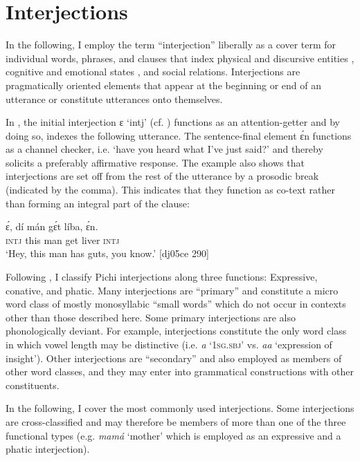 \section{Interjections}\label{sec:12.2}

In the following, I employ the term “interjection” liberally as a cover term for individual words, phrases, and clauses that index physical and discursive entities \citep{Kockelman2003}, cognitive and emotional states \citep{Ameka1992a}, and social relations. Interjections are pragmatically oriented elements that appear at the beginning or end of an utterance or constitute utterances onto themselves.


In , the initial interjection ɛ ‘intj’ (cf. ) functions as an attention-getter and by doing so, indexes the following utterance. The sentence-final element ɛ́n functions as a channel checker, i.e. ‘have you heard what I’ve just said?’ and thereby solicits a preferably affirmative response. The example also shows that interjections are set off from the rest of the utterance by a prosodic break (indicated by the comma). This indicates that they function as co-text rather than forming an integral part of the clause:



\ea%
    \label{ex:key:1635}
    \gll ɛ́,  dí  mán    gɛ́t  líba,    ɛ́n.\\
\textsc{intj}  this  man    get  liver  \textsc{intj}\\

\glt ‘Hey, this man has guts, you know.’ [dj05ce 290]
\z

Following \citet{Ameka1992a,Ameka1992b}, I classify Pichi interjections along three functions: Expressive, conative, and phatic. Many interjections are “primary” \citep{Ameka1992a} and constitute a micro word class of mostly monosyllabic “small words” which do not occur in contexts other than those described here. Some primary interjections are also phonologically deviant. For example, interjections constitute the only word class in which vowel length may be distinctive (i.e. \textit{a} ‘\textsc{1sg.sbj}’ vs. \textit{aa} ‘expression of insight’). Other interjections are “secondary” and also employed as members of other word classes, and they may enter into grammatical constructions with other constituents. 


In the following, I cover the most commonly used interjections. Some interjections are cross-classified and may therefore be members of more than one of the three functional types (e.g. \textit{mamá} ‘mother’ which is employed as an expressive and a phatic interjection). 


